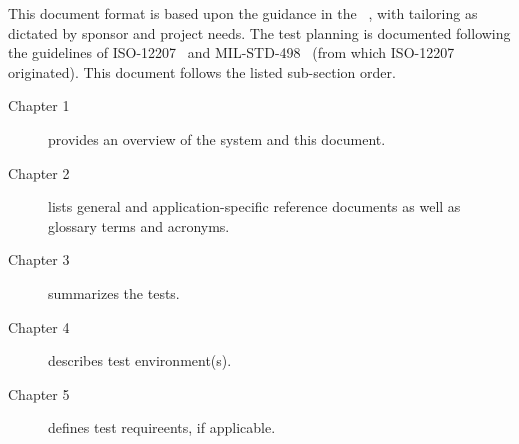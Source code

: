 This document format is based upon the guidance in the \STP \DID~\cite{ref__STP_DID}, with tailoring as dictated by sponsor and project needs.
The test planning is documented following the guidelines of ISO-12207~\cite{ref__ISO_12207} and MIL-STD-498~\cite{ref__MIL_STD_498} (from which ISO-12207 originated).
This document follows the listed \STP sub-section order.
\begin{description}
	\item[Chapter 1] provides an overview of the system and this document.
	\item[Chapter 2] lists general and application-specific reference documents as well as glossary terms and acronyms. 
	\item[Chapter 3] summarizes the tests.
	\item[Chapter 4] describes test environment(s).
	\item[Chapter 5] defines test requireents, if applicable.
\end{description}